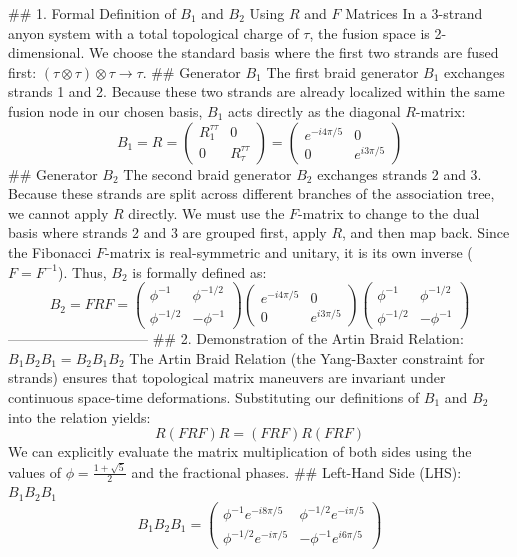 ## 1. Formal Definition of $B_1$ and $B_2$ Using $R$ and $F$ Matrices
In a 3-strand anyon system with a total topological charge of $\tau$, the fusion space is 2-dimensional. We choose the standard basis where the first two strands are fused first: $(\tau \otimes \tau) \otimes \tau \to \tau$.
## Generator $B_1$
The first braid generator $B_1$ exchanges strands 1 and 2. Because these two strands are already localized within the same fusion node in our chosen basis, $B_1$ acts directly as the diagonal $R$-matrix:
$$B_1 = R = \begin{pmatrix} R^{\tau\tau}_1 & 0 \\ 0 & R^{\tau\tau}_\tau \end{pmatrix} = \begin{pmatrix} e^{-i 4\pi/5} & 0 \\ 0 & e^{i 3\pi/5} \end{pmatrix}$$ 
## Generator $B_2$
The second braid generator $B_2$ exchanges strands 2 and 3. Because these strands are split across different branches of the association tree, we cannot apply $R$ directly. We must use the $F$-matrix to change to the dual basis where strands 2 and 3 are grouped first, apply $R$, and then map back.
Since the Fibonacci $F$-matrix is real-symmetric and unitary, it is its own inverse ($F = F^{-1}$). Thus, $B_2$ is formally defined as:
$$B_2 = F R F = \begin{pmatrix} \phi^{-1} & \phi^{-1/2} \\ \phi^{-1/2} & -\phi^{-1} \end{pmatrix} \begin{pmatrix} e^{-i 4\pi/5} & 0 \\ 0 & e^{i 3\pi/5} \end{pmatrix} \begin{pmatrix} \phi^{-1} & \phi^{-1/2} \\ \phi^{-1/2} & -\phi^{-1} \end{pmatrix}$$ 
------------------------------
## 2. Demonstration of the Artin Braid Relation: $B_1 B_2 B_1 = B_2 B_1 B_2$
The Artin Braid Relation (the Yang-Baxter constraint for strands) ensures that topological matrix maneuvers are invariant under continuous space-time deformations. Substituting our definitions of $B_1$ and $B_2$ into the relation yields:
$$R (F R F) R = (F R F) R (F R F)$$ 
We can explicitly evaluate the matrix multiplication of both sides using the values of $\phi = \frac{1+\sqrt{5}}{2}$ and the fractional phases.
## Left-Hand Side (LHS): $B_1 B_2 B_1$
$$B_1 B_2 B_1 = \begin{pmatrix} \phi^{-1} e^{-i 8\pi/5} & \phi^{-1/2} e^{-i \pi/5} \\ \phi^{-1/2} e^{-i \pi/5} & -\phi^{-1} e^{i 6\pi/5} \end{pmatrix}$$ 
